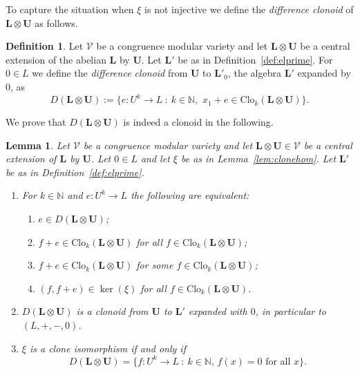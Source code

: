 \documentclass[12pt]{amsart}
\numberwithin{equation}{section}
\theoremstyle{plain}
\newtheorem{lemma}[theorem]{Lemma}
\theoremstyle{definition}
\newtheorem{definition}[theorem]{Definition}
\newcommand{\st}{\ :\ }
\renewcommand{\L}{\mathbf{L}}
\newcommand{\N}{\mathbb{N}}
\newcommand{\U}{\mathbf{U}}
\newcommand{\V}{\mathcal{V}}
\newcommand{\Clo}{\mathrm{Clo}}
\begin{document}
To capture the situation when $\xi$ is not injective we define the \emph{difference clonoid} of $\L\otimes\U$ as follows.
 
\begin{definition} \label{def:differenceclonoid} 
  Let $\V$ be a congruence modular variety and let $\L \otimes \U$ be a central extension of the abelian $\L$ by $\U$.
  Let  $\L'$ be as in Definition~\ref{def:elprime}.
  For $0 \in L$ we define the \emph{difference clonoid} from $\U$ to $\L'_0$, the algebra $\L'$ expanded by $0$, as
    \[ D(\L\otimes\U) := \{ e\colon U^k\to L \st k\in\N, \,\, x_1+e \in\Clo_k(\L\otimes\U) \}. \]
\end{definition}

We prove that $D(\L\otimes\U)$ is indeed a clonoid in the following.
 
\begin{lemma} \label{lem:diff} 
  Let $\V$ be a congruence modular variety and let $\L \otimes \U \in \V$ be a central extension of $\L$ by $\U$. 
  Let $0 \in L$ and let $\xi$ be as in Lemma~\ref{lem:clonehom}.  
  Let  $\L'$ be as in Definition~\ref{def:elprime}.
  \begin{enumerate}
    \item  \label{it:addon}
      For $k\in\N$ and $e\colon U^k\to L$ the following are equivalent:
      \begin{enumerate} 
        \item $e\in D(\L\otimes\U)$;
        \item $f+e \in\Clo_k(\L\otimes\U)$ for all $f\in\Clo_k(\L\otimes\U)$;
        \item $f+e \in\Clo_k(\L\otimes\U)$ for some $f\in\Clo_k(\L\otimes\U)$;
        \item $(f, f+e) \in \ker(\xi)$ for all $f \in \Clo_k(\L \otimes \U)$.
      \end{enumerate}   
    \item \label{it:clonoid}
      $D(\L\otimes\U)$ is a clonoid from $\U$ to $\L'$ expanded with $0$, in particular to $(L,+,-,0)$.
    \item \label{it:zero} 
      $\xi$ is a clone isomorphism if and only if
        \[D(\L\otimes\U) = \{ f \colon U^k \rightarrow L \st k \in \N, \,  f(x) = 0 \text{ for all } x \}.\]
  \end{enumerate}
\end{lemma}
\end{document}

